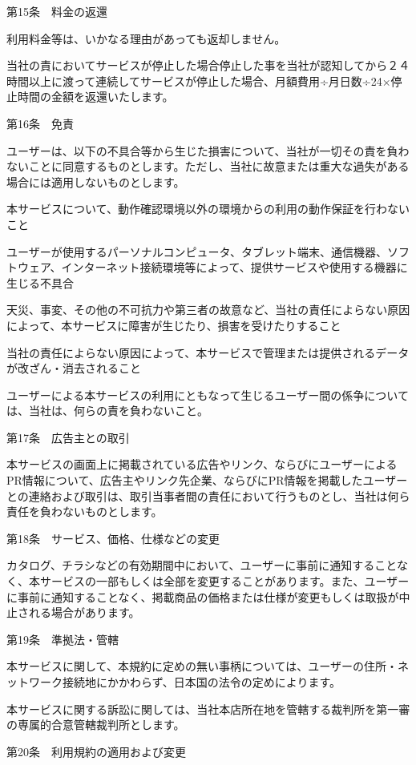 第15条　料金の返還

    利用料金等は、いかなる理由があっても返却しません。 

    当社の責においてサービスが停止した場合停止した事を当社が認知してから２４時間以上に渡って連続してサービスが停止した場合、月額費用÷月日数÷24×停止時間の金額を返還いたします。

第16条　免責

    ユーザーは、以下の不具合等から生じた損害について、当社が一切その責を負わないことに同意するものとします。ただし、当社に故意または重大な過失がある場合には適用しないものとします。

    本サービスについて、動作確認環境以外の環境からの利用の動作保証を行わないこと

    ユーザーが使用するパーソナルコンピュータ、タブレット端末、通信機器、ソフトウェア、インターネット接続環境等によって、提供サービスや使用する機器に生じる不具合

    天災、事変、その他の不可抗力や第三者の故意など、当社の責任によらない原因によって、本サービスに障害が生じたり、損害を受けたりすること

    当社の責任によらない原因によって、本サービスで管理または提供されるデータが改ざん・消去されること

    ユーザーによる本サービスの利用にともなって生じるユーザー間の係争については、当社は、何らの責を負わないこと。

第17条　広告主との取引

    本サービスの画面上に掲載されている広告やリンク、ならびにユーザーによるPR情報について、広告主やリンク先企業、ならびにPR情報を掲載したユーザーとの連絡および取引は、取引当事者間の責任において行うものとし、当社は何ら責任を負わないものとします。

第18条　サービス、価格、仕様などの変更

    カタログ、チラシなどの有効期間中において、ユーザーに事前に通知することなく、本サービスの一部もしくは全部を変更することがあります。また、ユーザーに事前に通知することなく、掲載商品の価格または仕様が変更もしくは取扱が中止される場合があります。

第19条　準拠法・管轄

    本サービスに関して、本規約に定めの無い事柄については、ユーザーの住所・ネットワーク接続地にかかわらず、日本国の法令の定めによります。

    本サービスに関する訴訟に関しては、当社本店所在地を管轄する裁判所を第一審の専属的合意管轄裁判所とします。

第20条　利用規約の適用および変更

